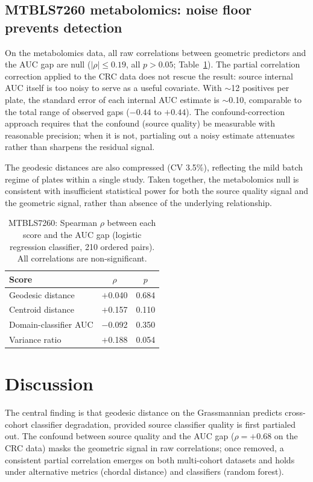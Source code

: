 \documentclass{article}
\begin{document}
\subsection{MTBLS7260 metabolomics: noise floor prevents detection}
\label{sec:metabolomics}

On the metabolomics data, all raw correlations between geometric predictors and the AUC gap are null ($|\rho| \leq 0.19$, all $p > 0.05$; Table~\ref{tab:baselines_metab}). The partial correlation correction applied to the CRC data does not rescue the result: source internal AUC itself is too noisy to serve as a useful covariate. With $\sim$12 positives per plate, the standard error of each internal AUC estimate is $\sim$0.10, comparable to the total range of observed gaps ($-0.44$ to $+0.44$). The confound-correction approach requires that the confound (source quality) be measurable with reasonable precision; when it is not, partialing out a noisy estimate attenuates rather than sharpens the residual signal.

The geodesic distances are also compressed (CV 3.5\%), reflecting the mild batch regime of plates within a single study. Taken together, the metabolomics null is consistent with insufficient statistical power for both the source quality signal and the geometric signal, rather than absence of the underlying relationship.

\begin{table}[t]
\centering
\caption{MTBLS7260: Spearman $\rho$ between each score and the AUC gap (logistic regression classifier, 210 ordered pairs). All correlations are non-significant.}
\label{tab:baselines_metab}
\begin{tabular}{lcc}
\toprule
Score & $\rho$ & $p$ \\
\midrule
Geodesic distance     & $+$0.040 & 0.684 \\
Centroid distance     & $+$0.157 & 0.110 \\
Domain-classifier AUC & $-$0.092 & 0.350 \\
Variance ratio        & $+$0.188 & 0.054 \\
\bottomrule
\end{tabular}
\end{table}


\section{Discussion}
\label{sec:discussion}

The central finding is that geodesic distance on the Grassmannian predicts cross-cohort classifier degradation, provided source classifier quality is first partialed out. The confound between source quality and the AUC gap ($\rho = +0.68$ on the CRC data) masks the geometric signal in raw correlations; once removed, a consistent partial correlation emerges on both multi-cohort datasets and holds under alternative metrics (chordal distance) and classifiers (random forest).
\end{document}
